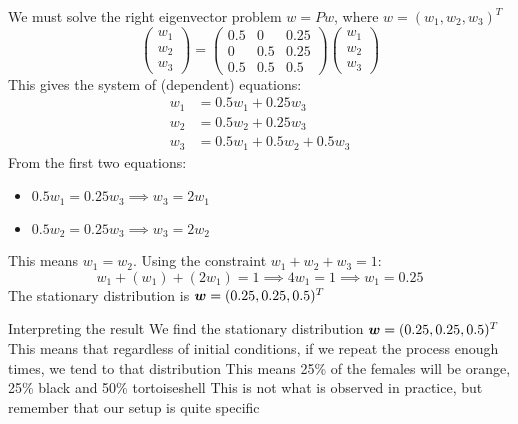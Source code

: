 \documentclass[aspectratio=169]{beamer}\usepackage[]{graphicx}\usepackage[]{xcolor}
\begin{document}
\begin{frame}
We must solve the right eigenvector problem $w = Pw$, where $w = (w_1, w_2, w_3)^T$
\[
\begin{pmatrix} w_1 \\ w_2 \\ w_3 \end{pmatrix}
=
\begin{pmatrix}
0.5 & 0 & 0.25 \\
0 & 0.5 & 0.25 \\
0.5 & 0.5 & 0.5
\end{pmatrix}
\begin{pmatrix} w_1 \\ w_2 \\ w_3 \end{pmatrix}
\]
This gives the system of (dependent) equations:
\begin{align*}
w_1 &= 0.5 w_1 + 0.25 w_3 \\
w_2 &= 0.5 w_2 + 0.25 w_3 \\
w_3 &= 0.5 w_1 + 0.5 w_2 + 0.5 w_3
\end{align*}
From the first two equations:
\begin{itemize}
    \item $0.5 w_1 = 0.25 w_3 \implies w_3 = 2w_1$
    \item $0.5 w_2 = 0.25 w_3 \implies w_3 = 2w_2$
\end{itemize}
\vfill
This means $w_1 = w_2$. Using the constraint $w_1+w_2+w_3 = 1$:
\[
w_1 + (w_1) + (2w_1) = 1 \implies 4w_1 = 1 \implies w_1 = 0.25
\]
\vfill
The stationary distribution is $\bm{w} = (0.25, 0.25,0.5)^T$
\end{frame}

\begin{frame}{Interpreting the result}
We find the stationary distribution $\bm{w} = (0.25, 0.25,0.5)^T$
\vfill
This means that regardless of initial conditions, if we repeat the process enough times, we tend to that distribution
\vfill
This means 25\% of the females will be orange, 25\% black and 50\% tortoiseshell
\vfill
This is not what is observed in practice, but remember that our setup is quite specific
\end{frame}
\end{document}
